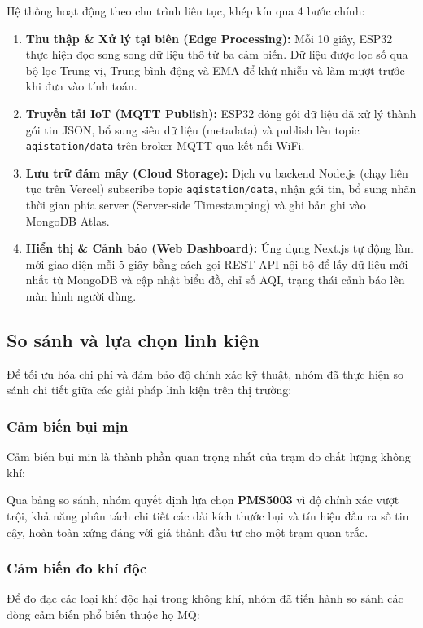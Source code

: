 \documentclass[12pt,a4paper]{article}
\begin{document}
Hệ thống hoạt động theo chu trình liên tục, khép kín qua 4 bước chính:
\begin{enumerate}
    \item \textbf{Thu thập \& Xử lý tại biên (Edge Processing):} Mỗi 10 giây, ESP32 thực hiện đọc song song dữ liệu thô từ ba cảm biến. Dữ liệu được lọc số qua bộ lọc Trung vị, Trung bình động và EMA để khử nhiễu và làm mượt trước khi đưa vào tính toán.
    \item \textbf{Truyền tải IoT (MQTT Publish):} ESP32 đóng gói dữ liệu đã xử lý thành gói tin JSON, bổ sung siêu dữ liệu (metadata) và publish lên topic \texttt{aqistation/data} trên broker MQTT qua kết nối WiFi.
    \item \textbf{Lưu trữ đám mây (Cloud Storage):} Dịch vụ backend Node.js (chạy liên tục trên Vercel) subscribe topic \texttt{aqistation/data}, nhận gói tin, bổ sung nhãn thời gian phía server (Server-side Timestamping) và ghi bản ghi vào MongoDB Atlas.
    \item \textbf{Hiển thị \& Cảnh báo (Web Dashboard):} Ứng dụng Next.js tự động làm mới giao diện mỗi 5 giây bằng cách gọi REST API nội bộ để lấy dữ liệu mới nhất từ MongoDB và cập nhật biểu đồ, chỉ số AQI, trạng thái cảnh báo lên màn hình người dùng.
\end{enumerate}

\subsection{So sánh và lựa chọn linh kiện}
Để tối ưu hóa chi phí và đảm bảo độ chính xác kỹ thuật, nhóm đã thực hiện so sánh chi tiết giữa các giải pháp linh kiện trên thị trường:


\subsubsection{Cảm biến bụi mịn}
Cảm biến bụi mịn là thành phần quan trọng nhất của trạm đo chất lượng không khí:

Qua bảng so sánh, nhóm quyết định lựa chọn \textbf{PMS5003} vì độ chính xác vượt trội, khả năng phân tách chi tiết các dải kích thước bụi và tín hiệu đầu ra số tin cậy, hoàn toàn xứng đáng với giá thành đầu tư cho một trạm quan trắc.

\subsubsection{Cảm biến đo khí độc}
Để đo đạc các loại khí độc hại trong không khí, nhóm đã tiến hành so sánh các dòng cảm biến phổ biến thuộc họ MQ:
\end{document}
